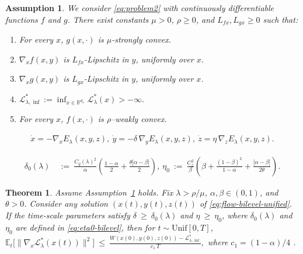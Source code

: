 \documentclass[10pt,a4paper]{amsart}
\newtheorem{assumption}{Assumption}
\newtheorem{theorem}{Theorem}
\begin{document}
\begin{assumption}\label{ass:2}
We consider \ref{eq:problem2} with continuously differentiable functions $f$ and $g$.
There exist constants $\mu>0$, $\rho\ge 0$, and $L_{fx},L_{gx}\ge 0$ such that:
\begin{enumerate}%
  \item For every $x$, $g(x,\cdot)$ is $\mu$-strongly convex.
  \item $\nabla_x f(x,y)$ is $L_{fx}$-Lipschitz in $y$, uniformly over $x$.
  \item $\nabla_x g(x,y)$ is $L_{gx}$-Lipschitz in $y$, uniformly over $x$.
  \item $\mathcal{L}_{\lambda,\inf}^{*}:=\inf_{x\in\mathbb{R}^{d_x}} \mathcal L_\lambda^{*}(x) > -\infty.$
  \item For every $x$, $f(x,\cdot)$ is $\rho$--weakly convex.
\end{enumerate}
\end{assumption}

\begin{equation}\label{eq:flow-bilevel-unified}
\begin{aligned}
\dot x = -\nabla_x E_\lambda(x,y,z),\
\dot y = -\delta\,\nabla_y E_\lambda(x,y,z),\
\dot z = \eta\,\nabla_z E_\lambda(x,y,z).
\end{aligned}
\end{equation}

\begin{align}
\delta_0(\lambda)
\ &:=\ \frac{C_y(\lambda)^2}{\alpha}
\left(\frac{1-\alpha}{2}+\frac{\theta|\alpha-\beta|}{2}\right), \
\eta_0
\ :=\ \frac{C_z^2}{\beta}
\left(\beta+\frac{(1-\beta)^2}{1-\alpha}+\frac{|\alpha-\beta|}{2\theta}\right).
\label{eq:eta0-bilevel}
\end{align}

\begin{theorem}\label{thm:fixed-lambda-simple}
Assume Assumption~\ref{ass:2} holds. Fix $\lambda>\rho/\mu$, $\alpha,\beta\in(0,1)$, and $\theta>0$.
Consider any solution $(x(t),y(t),z(t))$ of \eqref{eq:flow-bilevel-unified}.
If the time-scale parameters satisfy $\delta \ \ge\ \delta_0(\lambda)$ and $\eta \ \ge\ \eta_0$, where $\delta_0(\lambda)$ and $\eta_0$ are defined in \eqref{eq:eta0-bilevel},
then for $t\sim\mathrm{Unif}[0,T]$,
$
\mathbb E_t\Big[\bigl\|\nabla_x \mathcal L_\lambda^{*}(x(t))\bigr\|^{2}\Big]
\ \le\ \frac{W(x(0),y(0),z(0))-\mathcal L_{\lambda,\inf}^{*}}{c_1\,T},
$
where $c_1= (1-\alpha)/4$ .
\end{theorem}
\end{document}
